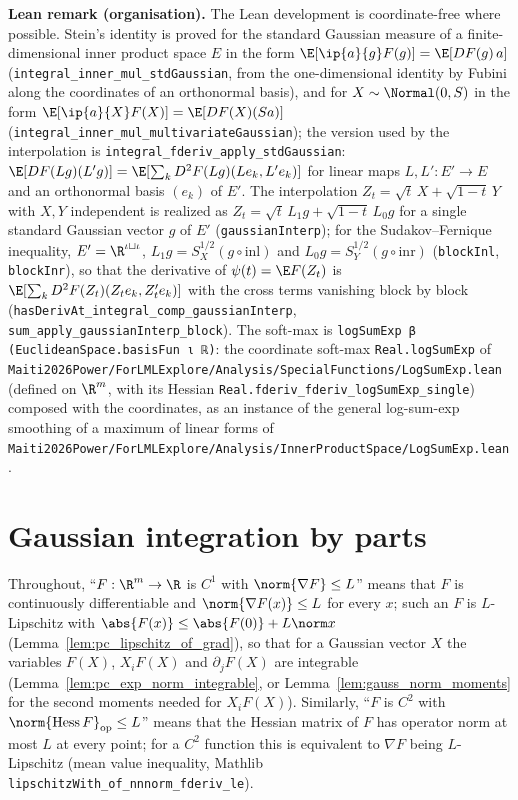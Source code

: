 \textbf{Lean remark (organisation).} The Lean development is coordinate-free where possible.
Stein's identity is proved for the standard Gaussian measure of a finite-dimensional inner
product space $E$ in the form $\E[\ip{a}{g}F(g)] = \E[DF(g)\,a]$
(\texttt{integral\_inner\_mul\_stdGaussian}, from the one-dimensional identity by Fubini along
the coordinates of an orthonormal basis), and for $X\sim\Normal(0,S)$ in the form
$\E[\ip{a}{X}F(X)] = \E[DF(X)(Sa)]$ (\texttt{integral\_inner\_mul\_multivariateGaussian}); the
version used by the interpolation is \texttt{integral\_fderiv\_apply\_stdGaussian}:
$\E[DF(Lg)(L'g)] = \E[\sum_k D^2F(Lg)(Le_k, L'e_k)]$ for linear maps $L, L' : E'\to E$ and an
orthonormal basis $(e_k)$ of $E'$. The interpolation $Z_t = \sqrt t\,X + \sqrt{1-t}\,Y$ with
$X, Y$ independent is realized as $Z_t = \sqrt t\,L_1 g + \sqrt{1-t}\,L_0 g$ for a single
standard Gaussian vector $g$ of $E'$ (\texttt{gaussianInterp}); for the Sudakov--Fernique
inequality, $E' = \R^{\iota\sqcup\iota}$, $L_1 g = S_X^{1/2}(g\circ\mathrm{inl})$ and
$L_0 g = S_Y^{1/2}(g\circ\mathrm{inr})$ (\texttt{blockInl}, \texttt{blockInr}), so that the
derivative of $\psi(t) = \E F(Z_t)$ is
$\E[\sum_k D^2F(Z_t)(Z_te_k, Z_t'e_k)]$ with the cross terms vanishing block by block
(\texttt{hasDerivAt\_integral\_comp\_gaussianInterp}, \texttt{sum\_apply\_gaussianInterp\_block}).
The soft-max is \texttt{logSumExp β (EuclideanSpace.basisFun ι ℝ)}: the coordinate soft-max
\texttt{Real.logSumExp} of \texttt{Maiti2026Power/ForLMLExplore/Analysis/SpecialFunctions/LogSumExp.lean}
(defined on $\R^m$, with its Hessian \texttt{Real.fderiv\_fderiv\_logSumExp\_single}) composed
with the coordinates, as an instance of the general log-sum-exp smoothing of a maximum of linear
forms of \texttt{Maiti2026Power/ForLMLExplore/Analysis/InnerProductSpace/LogSumExp.lean}.

\section{Gaussian integration by parts}
\label{sec:pre_sudakov_stein}

Throughout, ``$F : \R^m\to\R$ is $C^1$ with $\norm{\nabla F}\le L$'' means that $F$ is
continuously differentiable and $\norm{\nabla F(x)}\le L$ for every $x$; such an $F$ is
$L$-Lipschitz with $\abs{F(x)}\le\abs{F(0)}+L\norm x$ (Lemma~\ref{lem:pc_lipschitz_of_grad}),
so that for a Gaussian vector $X$ the variables $F(X)$, $X_iF(X)$ and $\partial_jF(X)$ are
integrable (Lemma~\ref{lem:pc_exp_norm_integrable}, or Lemma~\ref{lem:gauss_norm_moments}
for the second moments needed for $X_iF(X)$). Similarly, ``$F$ is $C^2$ with
$\norm{\mathrm{Hess}\,F}_{\mathrm{op}}\le L$'' means that the Hessian matrix of $F$ has
operator norm at most $L$ at every point; for a $C^2$ function this is equivalent to $\nabla F$
being $L$-Lipschitz (mean value inequality, Mathlib
\texttt{lipschitzWith\_of\_nnnorm\_fderiv\_le}).

